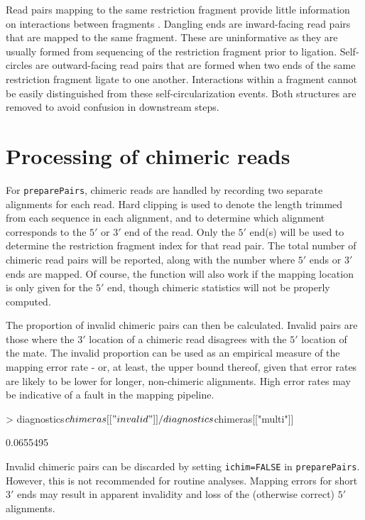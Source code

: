 \documentclass[12pt]{report}
\renewenvironment{Schunk}{\vspace{0pt}}{\vspace{0pt}}
\newcommand{\code}[1]{{\small\texttt{#1}}}
\begin{document}
Read pairs mapping to the same restriction fragment provide little information on interactions between fragments \citep{belton2012hic}.
Dangling ends are inward-facing read pairs that are mapped to the same fragment.
These are uninformative as they are usually formed from sequencing of the restriction fragment prior to ligation.
Self-circles are outward-facing read pairs that are formed when two ends of the same restriction fragment ligate to one another.
Interactions within a fragment cannot be easily distinguished from these self-circularization events.
Both structures are removed to avoid confusion in downstream steps.

\section{Processing of chimeric reads}
For \code{preparePairs}, chimeric reads are handled by recording two separate alignments for each read.
Hard clipping is used to denote the length trimmed from each sequence in each alignment, and to determine which alignment corresponds to the $5'$ or $3'$ end of the read.
Only the $5'$ end(s) will be used to determine the restriction fragment index for that read pair.
The total number of chimeric read pairs will be reported, along with the number where $5'$ ends or $3'$ ends are mapped.
Of course, the function will also work if the mapping location is only given for the $5'$ end, though chimeric statistics will not be properly computed.

The proportion of invalid chimeric pairs can then be calculated.
Invalid pairs are those where the $3'$ location of a chimeric read disagrees with the $5'$ location of the mate.
The invalid proportion can be used as an empirical measure of the mapping error rate - or, at least, the upper bound thereof, given that error rates are likely to be lower for longer, non-chimeric alignments.
High error rates may be indicative of a fault in the mapping pipeline.

\begin{Schunk}
\begin{Sinput}
> diagnostics$chimeras[["invalid"]]/diagnostics$chimeras[["multi"]]
\end{Sinput}
\begin{Soutput}
[1] 0.0655495
\end{Soutput}
\end{Schunk}

Invalid chimeric pairs can be discarded by setting \code{ichim=FALSE} in \code{preparePairs}.
However, this is not recommended for routine analyses.
Mapping errors for short $3'$ ends may result in apparent invalidity and loss of the (otherwise correct) $5'$ alignments.
\end{document}
